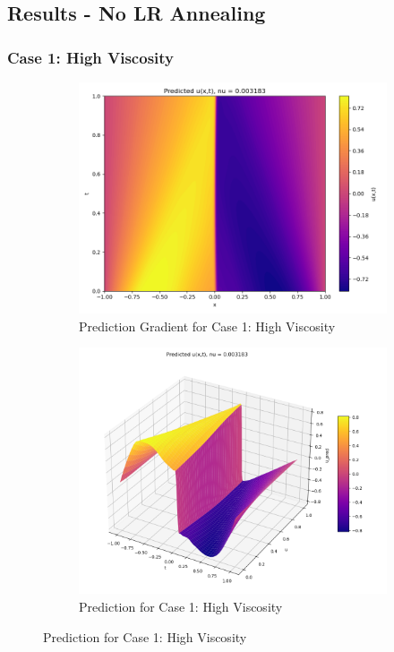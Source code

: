 \documentclass[11pt]{article}
\begin{document}
\subsection{Results - No LR Annealing}
\subsubsection{Case 1: High Viscosity}
\begin{figure}[h!]
    \centering
    \begin{subfigure}[b]{0.48\textwidth}
        \includegraphics[width=\textwidth]{1D_PredGrad_NU1.png}
        \caption{Prediction Gradient for Case 1: High Viscosity}
        \label{fig:PredGrad_NU1}
    \end{subfigure}
    \hfill
    \begin{subfigure}[b]{0.48\textwidth}
        \includegraphics[width=\textwidth]{1D_Pred_NU1.png}
        \caption{Prediction for Case 1: High Viscosity}
        \label{fig:Pred_NU1}
    \end{subfigure}
    \caption{Prediction for Case 1: High Viscosity}
    \label{fig:PredTotal_NU1}
\end{figure}
\end{document}

